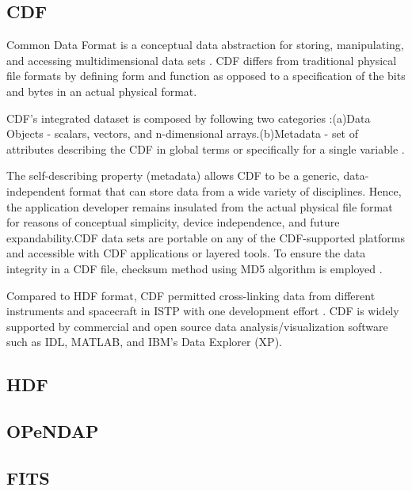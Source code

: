 {\subsection{CDF }

     Common Data Format is a conceptual data
     abstraction for storing, manipulating, and accessing
     multidimensional data sets \cite{www-cdf}. CDF differs
     from traditional physical
     file formats by defining form and function as opposed to a
     specification of the bits and bytes in an actual physical format.
 
     CDF's integrated dataset is composed by following two categories
     :(a)Data Objects - scalars, vectors, and n-dimensional
     arrays.(b)Metadata - set of attributes describing the CDF in
     global terms or specifically for a single variable
     \cite{user-guide-cdf}.

     The self-describing property (metadata) allows CDF to be a
     generic, data-independent format that can store data from a wide
     variety of disciplines. Hence, the application developer remains
     insulated from the actual physical file format for reasons of
     conceptual simplicity, device independence, and future
     expandability.CDF data sets are portable on any of the
     CDF-supported platforms and accessible with CDF applications or
     layered tools. To ensure the data integrity in a CDF file,
     checksum method using MD5 algorithm is employed
     \cite{www-digitalpreserve}.

     Compared to HDF format, CDF permitted
     cross-linking data from different instruments and spacecraft in
     ISTP with one development effort \cite{www-wiki-hdf}.
     CDF is widely supported by
     commercial and open source data analysis/visualization software
     such as IDL, MATLAB, and IBM’s Data Explorer (XP).

     \pv

\subsection{HDF}

\pv 

\subsection{OPeNDAP}
\pv

\subsection{FITS}

}
